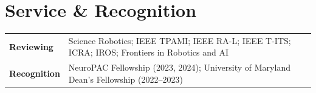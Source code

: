 \documentclass[11pt,letterpaper]{article}
\begin{document}
\section{Service \& Recognition}

\begin{tabularx}{\linewidth}{@{}>{\bfseries}p{7.4em}@{}>{\raggedright\arraybackslash}X@{}}
Reviewing & Science Robotics; IEEE TPAMI; IEEE RA-L; IEEE T-ITS; ICRA; IROS; Frontiers in Robotics and AI \\
Recognition & NeuroPAC Fellowship (2023, 2024); University of Maryland Dean's Fellowship (2022--2023) \\
\end{tabularx}
\end{document}
